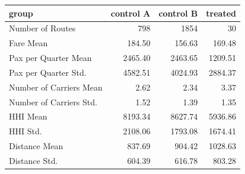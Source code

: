 \begin{tabular}{lrrr}
\toprule
group & control A & control B & treated \\
\midrule
Number of Routes & 798 & 1854 & 30 \\
Fare Mean & 184.50 & 156.63 & 169.48 \\
Pax per Quarter Mean & 2465.40 & 2463.65 & 1209.51 \\
Pax per Quarter Std. & 4582.51 & 4024.93 & 2884.37 \\
Number of Carriers Mean & 2.62 & 2.34 & 3.37 \\
Number of Carriers Std. & 1.52 & 1.39 & 1.35 \\
HHI Mean & 8193.34 & 8627.74 & 5936.86 \\
HHI Std. & 2108.06 & 1793.08 & 1674.41 \\
Distance Mean & 837.69 & 904.42 & 1028.63 \\
Distance Std. & 604.39 & 616.78 & 803.28 \\
\bottomrule
\end{tabular}
